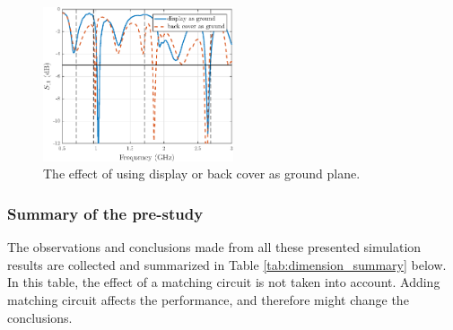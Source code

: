 \begin{figure}[H]
    \centering
    \includegraphics[width=0.5\textwidth]{img/ground_vs_display.eps}
    \caption{The effect of using display or back cover as ground plane.}
    \label{fig:ground_plane}
\end{figure}

\subsubsection{Summary of the pre-study}
\label{sec:pre_study_summary}
The observations and conclusions made from all these presented simulation results are collected and summarized in Table \ref{tab:dimension_summary} below. In this table, the effect of a matching circuit is not taken into account. Adding matching circuit affects the performance, and therefore might change the conclusions.


